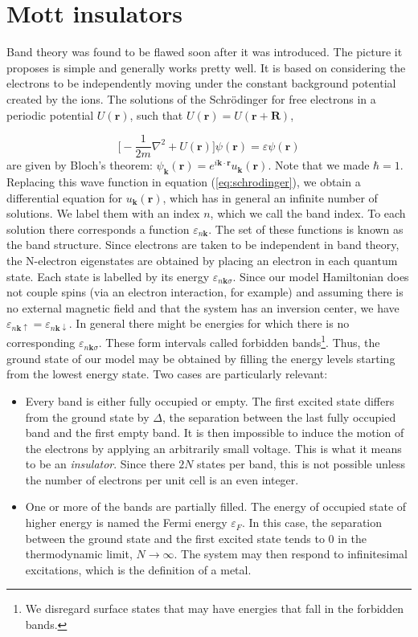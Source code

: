 \section{Mott insulators}\label{sec:mott}

Band theory was found to be flawed soon after it was introduced. The picture it proposes is simple and generally works pretty well. It is based on considering the electrons to be independently moving under the constant background potential created by the ions. The solutions of the Schr\"odinger for free electrons in a periodic potential $U(\bm r)$, such that $U(\bm r) = U(\bm r + \bm R)$,

\begin{equation}\label{eq:schrodinger}
\bigg[ -\frac{1}{2m} \nabla^2 + U(\bm r) \bigg] \psi (\bm r) = \varepsilon \psi (\bm r)
\end{equation}
are given by Bloch's theorem: $\psi_{\bm k} (\bm r) = e^{i\bm k \cdot \bm r} u_{\bm k} (\bm r)$. Note that we made $\hbar = 1$. Replacing this wave function in equation (\ref{eq:schrodinger}), we obtain a differential equation for $u_{\bm k} (\bm r)$, which has in general an infinite number of solutions. We label them with an index $n$, which we call the band index. To each solution there corresponds a function $\varepsilon_{n\bm k}$. The set of these functions is known as the band structure. Since electrons are taken to be independent in band theory, the N-electron eigenstates are obtained by placing an electron in each quantum state. Each state is labelled by its energy $\varepsilon_{n\bm k \sigma}$. Since our model Hamiltonian does not couple spins (via an electron interaction, for example) and assuming there is no external magnetic field and that the system has an inversion center, we have $\varepsilon_{n\bm k \uparrow} = \varepsilon_{n\bm k \downarrow}$. In general there might be energies for which there is no corresponding $\varepsilon_{n\bm k \sigma}$. These form intervals called forbidden bands\footnote{We disregard surface states that may have energies that fall in the forbidden bands.}. Thus, the ground state of our model may be obtained by filling the energy levels starting from the lowest energy state. Two cases are particularly relevant:
\begin{itemize}
\item Every band is either fully occupied or empty. The first excited state differs from the ground state by $\Delta$, the separation between the last fully occupied band and the first empty band. It is then impossible to induce the motion of the electrons by applying an arbitrarily small voltage. This is what it means to be an \emph{insulator}. Since there $2N$ states per band, this is not possible unless the number of electrons per unit cell is an even integer.
\item One or more of the bands are partially filled. The energy of occupied state of higher energy is named the Fermi energy $\varepsilon_F$. In this case, the separation between the ground state and the first excited state tends to $0$ in the thermodynamic limit, $N \rightarrow \infty$. The system may then respond to infinitesimal excitations, which is the  definition of a metal.
\end{itemize}

